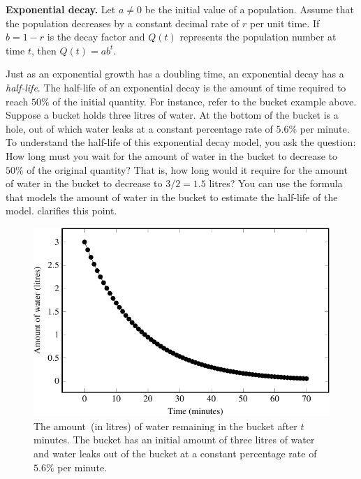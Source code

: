 \documentclass[a4paper,oneside,12pt]{article}
\begin{document}
\begin{theorem}
\label{thm:exponential_decay}
\textbf{Exponential decay.}
Let $a \neq 0$ be the initial value of a population.  Assume that the
population decreases by a constant decimal rate of $r$ per unit time.
If $b = 1 - r$ is the decay factor and $Q(t)$ represents the
population number at time $t$, then $Q(t) = ab^t$.
\end{theorem}

Just as an exponential growth has a doubling time, an exponential
decay has a \emph{half-life}.  The half-life of an exponential decay
is the amount of time required to reach $50\%$ of the initial
quantity.  For instance, refer to the bucket example above.  Suppose a
bucket holds three litres of water.  At the bottom of the bucket is a
hole, out of which water leaks at a constant percentage rate of
$5.6\%$ per minute.  To understand the half-life of this exponential
decay model, you ask the question:  How long must you wait for the
amount of water in the bucket to decrease to $50\%$ of the original
quantity?  That is, how long would it require for the amount of water
in the bucket to decrease to $3 / 2 = 1.5$ litres?  You can use the
formula that models the amount of water in the bucket to estimate the
half-life of the model.   clarifies this
point.

\begin{figure}[!htbp]
\centering
\includegraphics[scale=1.1]{image/11/water.pdf}
\caption{%
  The amount~(in litres) of water remaining in the bucket after $t$
  minutes.  The bucket has an initial amount of three litres of water
  and water leaks out of the bucket at a constant percentage rate of
  $5.6\%$ per minute.
}
\label{fig:bucket_water_level}
\end{figure}
\end{document}
